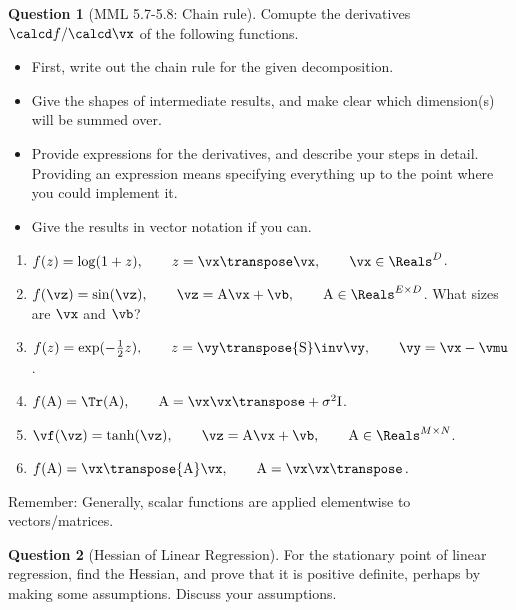 \documentclass[a4paper]{article}
\newcommand{\mat}[1]{{\mathrm{{#1}}}} %
\theoremstyle{definition}
\newtheorem{question}{Question}
\begin{document}
\begin{question}[MML 5.7-5.8: Chain rule]
Comupte the derivatives $\calcd f /\calcd\vx$ of the following functions.
\begin{itemize}
\item First, write out the chain rule for the given decomposition.
\item Give the shapes of intermediate results, and make clear which dimension(s) will be summed over.
\item Provide expressions for the derivatives, and describe your steps in detail. Providing an expression means specifying everything up to the point where you could implement it.
\item Give the results in vector notation if you can. 
\end{itemize}
\begin{enumerate}[label=\alph*.]
\item $f(z) = \log(1+z), \qquad z = \vx\transpose\vx, \qquad \vx \in \Reals^D$.
\item $f(\vz) = \sin(\vz), \qquad \vz = \mat A\vx + \vb, \qquad \mat A \in \Reals^{E\times D}$. What sizes are $\vx$ and $\vb$?
\item $f(z) = \exp(-\frac{1}{2}z), \qquad z = \vy\transpose \mat S\inv \vy, \qquad \vy = \vx -\vmu$.
\item $f(\mat A) = \Tr(\mat A), \qquad \mat A = \vx\vx\transpose + \sigma^2 \mat I$.
\item $\vf(\vz) = \tanh(\vz), \qquad \vz = \mat A \vx + \vb, \qquad \mat A \in \Reals^{M\times N}$.
\item $f(\mat A) = \vx\transpose\mat A\vx, \qquad \mat A = \vx\vx\transpose\,.$
\end{enumerate}
Remember: Generally, scalar functions are applied elementwise to vectors/matrices.
\end{question}



\begin{question}[Hessian of Linear Regression]
\label{q:hessian}
For the stationary point of linear regression, find the Hessian, and prove that it is positive definite, perhaps by making some assumptions. Discuss your assumptions.
\end{question}
\end{document}
